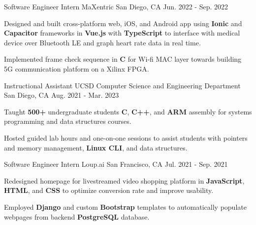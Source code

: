 \begin{cventries}
\cventry
  {Software Engineer Intern} %
  {MaXentric} %
  {San Diego, CA} %
  {Jun. 2022 - Sep. 2022} %
  {
    \begin{cvitems} %
      \item {Designed and built cross-platform web, iOS, and Android app using \textbf{Ionic} and \textbf{Capacitor} frameworks in \textbf{Vue.js} with \textbf{TypeScript} to interface with medical device over Bluetooth LE and graph heart rate data in real time.}
      \item {Implemented frame check sequence in \textbf{C} for Wi‐fi MAC layer towards building 5G communication platform on a Xilinx FPGA.}
    \end{cvitems}
  }


\cventry
  {Instructional Assistant} %
  {UCSD Computer Science and Engineering Department} %
  {San Diego, CA} %
  {Aug. 2021 - Mar. 2023} %
  {
    \begin{cvitems} %
      \item {Taught \textbf{500+} undergraduate students \textbf{C}, \textbf{C++}, and \textbf{ARM} assembly for systems programming and data structures courses.}
      \item {Hosted guided lab hours and one-on-one sessions to assist students with pointers and memory management, \textbf{Linux CLI}, and data structures.}
    \end{cvitems}
  }


\cventry
  {Software Engineer Intern} %
  {Loup.ai} %
  {San Francisco, CA} %
  {Jul. 2021 - Sep. 2021} %
  {
    \begin{cvitems} %
      \item {Redesigned homepage for livestreamed video shopping platform in \textbf{JavaScript}, \textbf{HTML}, and \textbf{CSS} to optimize conversion rate and improve usability.}
      \item {Employed \textbf{Django} and custom \textbf{Bootstrap} templates to automatically populate webpages from backend \textbf{PostgreSQL} database.}
    \end{cvitems}
  }



\end{cventries}
